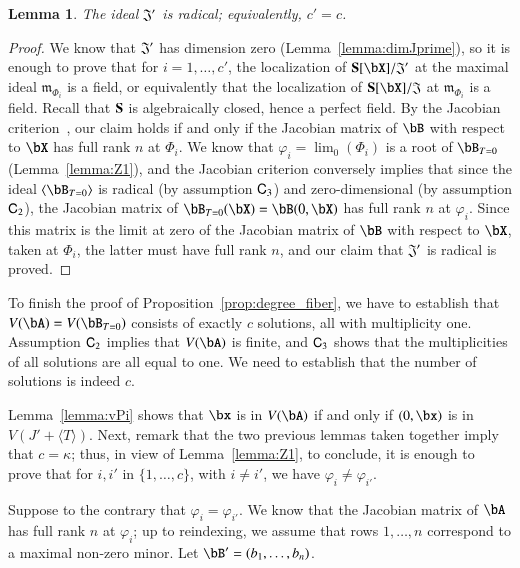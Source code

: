 \documentclass[amsthm]{elsart}
\newtheorem{lemma}[definition]{Lemma}
\begin{document}
\begin{lemma}\label{lemma:Jprimerad}
  The ideal $\frak{J}'$ is radical; equivalently, $c'=c$.
\end{lemma}
\begin{proof}
  We know that $\frak{J}'$ has dimension zero
  (Lemma~\ref{lemma:dimJprime}), so it is enough to prove that for
  $i=1,\dots,c'$, the localization of $\SS[\bX]/\frak{J}'$ at the
  maximal ideal $\mathfrak{m}_{\Phi_i}$ is a field, or equi\-valently
  that the localization of $\SS[\bX]/\frak{J}$ at
  $\mathfrak{m}_{\Phi_i}$ is a field.  Recall that $\mathbf{S}$ is
  algebraically closed, hence a perfect field. By the Jacobian
  criterion~\cite[Theorem~16.19.b]{Eisenbud95}, our claim holds if
  and only if the Jacobian matrix of $\bB$ with respect to $\bX$ has
  full rank $n$ at $\Phi_i$. We know that $\varphi_i=\lim_0(\Phi_i)$
  is a root of $\bB_{T=0}$ (Lemma~\ref{lemma:Z1}), and the Jacobian
  criterion conversely implies that since the ideal $\langle \bB_{T=0}
  \rangle$ is radical (by assumption $\mathsf{C}_3$) and zero-dimensional
  (by assumption $\mathsf{C}_2$), the Jacobian matrix of
  $\bB_{T=0}(\bX)=\bB(0,\bX)$ has full rank $n$ at $\varphi_i$. Since
  this matrix is the limit at zero of the Jacobian matrix of $\bB$
  with respect to $\bX$, taken at $\Phi_i$, the latter must have full
  rank $n$, and our claim that $\frak{J}'$ is radical is proved.
\end{proof}

To finish the proof of Proposition~\ref{prop:degree_fiber}, we have to
establish that $V(\bA)=V(\bB_{T=0})$ consists of exactly $c$
solutions, all with multiplicity one. Assumption $\mathsf{C}_2$ implies
that $V(\bA)$ is finite, and $\mathsf{C}_3$ shows that the multiplicities
of all solutions are all equal to one. We need to establish that the number
of solutions is indeed $c$.

Lemma~\ref{lemma:vPi} shows that $\bx$ is in $V(\bA)$ if and only if
$(0,\bx)$ is in $V(J' + \langle T\rangle)$. Next, remark that the two
previous lemmas taken together imply that $c=\kappa$; thus, in view of
Lemma~\ref{lemma:Z1}, to conclude, it is enough to prove that for
$i,i'$ in $\{1,\dots,c\}$, with $i \ne i'$, we have $\varphi_i \ne
\varphi_{i'}$.

Suppose to the contrary that $\varphi_i = \varphi_{i'}$. We know that
the Jacobian matrix of $\bA$ has full rank $n$ at $\varphi_i$; up to
reindexing, we assume that rows $1,\dots,n$ correspond to a maximal
non-zero minor. Let $\bB'=(b_1,\dots,b_n)$.
\end{document}
